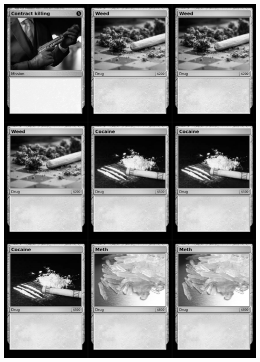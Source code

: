\documentclass[a4paper]{article}
\begin{document}
\newpage

\begin{center}
	\centering
	\includegraphics[width=200.5mm,height=280.7mm]{output/temp/page36.png}
\end{center}
\end{document}
